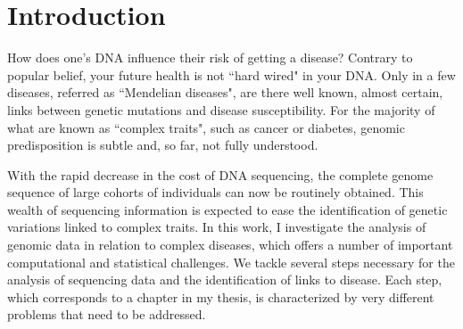 \chapter{Introduction \label{ch:intro}}

How does one's DNA influence their risk of getting a disease? Contrary to popular belief, your future health is not ``hard wired" in your DNA. Only in a few diseases, referred as ``Mendelian diseases", are there well known, almost certain, links between genetic mutations and disease susceptibility. For the majority of what are known as ``complex traits", such as cancer or diabetes, genomic predisposition is subtle and, so far, not fully understood.

With the rapid decrease in the cost of DNA sequencing, the complete genome sequence of large cohorts of individuals can now be routinely obtained. This wealth of sequencing information is expected to ease the identification of genetic variations linked to complex traits. In this work, I investigate the analysis of genomic data in relation to complex diseases, which offers a number of important computational and statistical challenges. We tackle several steps necessary for the analysis of sequencing data and the identification of links to disease. Each step, which corresponds to a chapter in my thesis, is characterized by very different problems that need to be addressed.

